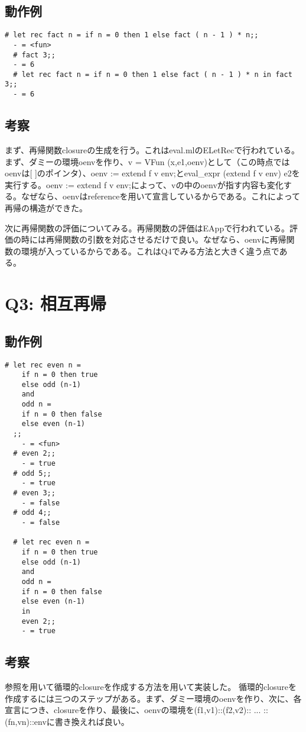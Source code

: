 \documentclass[uplatex,12pt]{jsarticle}
\begin{document}
\subsection{動作例}
\begin{lstlisting}[caption=動作例]
  # let rec fact n = if n = 0 then 1 else fact ( n - 1 ) * n;;
  - = <fun>
  # fact 3;;
  - = 6
  # let rec fact n = if n = 0 then 1 else fact ( n - 1 ) * n in fact 3;;
  - = 6
\end{lstlisting}

\subsection{考察}
まず、再帰関数closureの生成を行う。これはeval.mlのELetRecで行われている。まず、ダミーの環境oenvを作り、v = VFun (x,e1,oenv)として（この時点ではoenvは[ ]のポインタ）、oenv := extend f v env;とeval\_expr (extend f v env) e2を実行する。oenv := extend f v env;によって、vの中のoenvが指す内容も変化する。なぜなら、oenvはreferenceを用いて宣言しているからである。これによって再帰の構造ができた。

次に再帰関数の評価についてみる。再帰関数の評価はEAppで行われている。評価の時には再帰関数の引数を対応させるだけで良い。なぜなら、oenvに再帰関数の環境が入っているからである。これはQ4でみる方法と大きく違う点である。

\section{Q3: 相互再帰}
\subsection{動作例}
\begin{lstlisting}[caption=動作例]
  # let rec even n =
    if n = 0 then true
    else odd (n-1)
    and
    odd n =
    if n = 0 then false
    else even (n-1)
  ;;
    - = <fun>
  # even 2;;
    - = true
  # odd 5;;
    - = true
  # even 3;;
    - = false
  # odd 4;;
    - = false

  # let rec even n =
    if n = 0 then true
    else odd (n-1)
    and
    odd n =
    if n = 0 then false
    else even (n-1)
    in
    even 2;;
    - = true
\end{lstlisting}

\subsection{考察}
参照を用いて循環的closureを作成する方法を用いて実装した。
循環的closureを作成するには三つのステップがある。まず、ダミー環境のoenvを作り、次に、各宣言につき、closureを作り、最後に、oenvの環境を(f1,v1)::(f2,v2):: ... ::(fn,vn)::envに書き換えれば良い。
\end{document}
